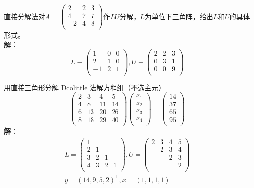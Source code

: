 \documentclass[UTF8,a4paper,11pt,oneside]{ctexbook}
\begin{document}
\vspace{4em}
直接分解法对\(A=\begin{pmatrix}
    2 & 2 & 3 \\
    4 & 7 & 7 \\
    -2 & 4 & 8 \\
\end{pmatrix}\)作\(LU\)分解，\(L\)为单位下三角阵，给出\(L\)和\(U\)的具体形式。\\
\textbf{解}：
\[
L=\begin{pmatrix}
    1 & 0 & 0 \\
    2 & 1 & 0 \\
    -1 & 2 & 1 \\
\end{pmatrix},
U=\begin{pmatrix}
    2 & 2 & 3 \\
    0 & 3 & 1 \\
    0 & 0 & 9 \\
\end{pmatrix}
\]

\vspace{4em}
用直接三角形分解 Doolittle 法解方程组（不选主元）
\[
\begin{pmatrix}
    2 & 3 & 4 & 5 \\
    4 & 8 & 11 & 14 \\
    6 & 13 & 20 & 26 \\
    8 & 18 & 29 & 40 \\
\end{pmatrix}
\begin{pmatrix}
    x_1 \\
    x_2 \\
    x_3 \\
    x_4 \\
\end{pmatrix}
=\begin{pmatrix}
    14 \\
    37 \\
    65 \\
    95 \\
\end{pmatrix}
\]
\textbf{解}：
\begin{gather*}
L=\begin{pmatrix}
    1 & & & \\
    2 & 1 & & \\
    3 & 2 & 1 & \\
    4 & 3 & 2 & 1\\
\end{pmatrix},
U=\begin{pmatrix}
    2 & 3 & 4 & 5 \\
    & 2 & 3 & 4 \\
    & & 2 & 3 \\
    & & & 2 \\
\end{pmatrix}\\
y=(14,9,5,2)^\top,x=(1,1,1,1)^\top
\end{gather*}
\end{document}

